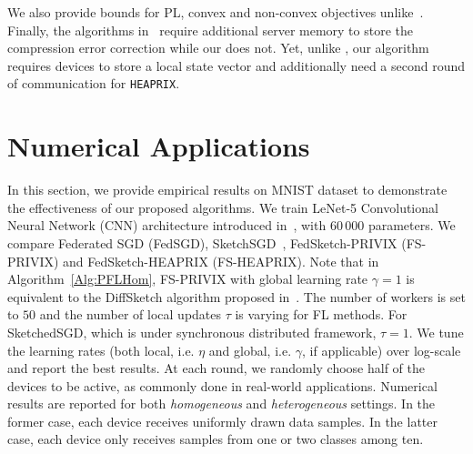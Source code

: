 \documentclass[twoside]{article}
\begin{document}
We also provide bounds for PL, convex and non-convex objectives unlike~\cite{rothchild2020fetchsgd}.
Finally, the algorithms in~\cite{rothchild2020fetchsgd} require additional server memory to store the compression error correction while our does not.
Yet, unlike \cite{rothchild2020fetchsgd}, our algorithm requires devices to store a local state vector and additionally need a second round of communication for \texttt{HEAPRIX}.

\vspace{-0.05in}
\section{Numerical Applications}\label{sec:experimnt}
\vspace{-0.05in}

In this section, we provide empirical results on MNIST dataset to demonstrate the effectiveness of our proposed algorithms. 
We train LeNet-5 Convolutional Neural Network (CNN) architecture introduced in~\cite{lecun1998gradient}, with $60\,000$ parameters.
We compare Federated SGD (FedSGD), SketchSGD~\cite{ivkin2019communication}, FedSketch-PRIVIX (FS-PRIVIX) and FedSketch-HEAPRIX (FS-HEAPRIX).
Note that in Algorithm~\ref{Alg:PFLHom}, FS-PRIVIX with global learning rate $\gamma=1$ is equivalent to the DiffSketch algorithm proposed in~\cite{li2018federated}. 
The number of workers is set to $50$ and the number of local updates $\tau$ is varying for FL methods. 
For SketchedSGD, which is under synchronous distributed framework, $\tau = 1$. 
We tune the learning rates (both local, i.e. $\eta$ and global, i.e. $\gamma$, if applicable) over log-scale and report the best results.
At each round, we randomly choose half of the devices to be active, as commonly done in real-world applications. 
Numerical results are reported for both \emph{homogeneous} and \emph{heterogeneous} settings. 
In the former case, each device receives uniformly drawn data samples. 
In the latter case, each device only receives samples from one or two classes among ten. 
\end{document}
